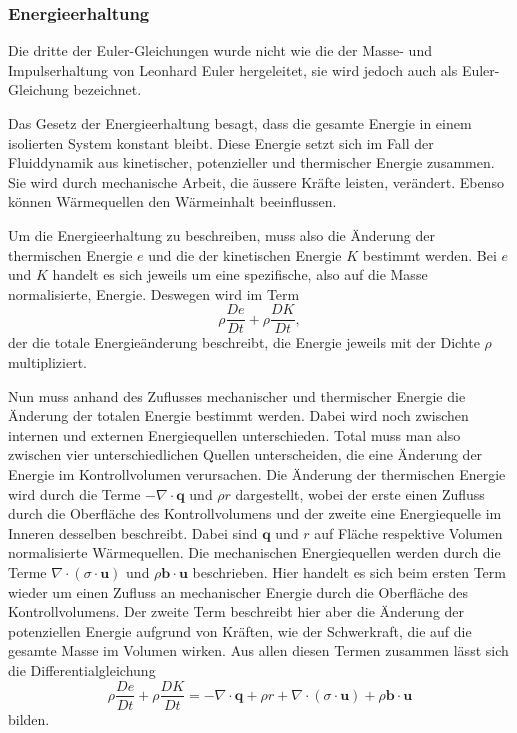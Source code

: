 \subsubsection{Energieerhaltung}
Die dritte der Euler-Gleichungen wurde nicht wie die der Masse- und Impulserhaltung von Leonhard Euler hergeleitet, sie wird jedoch auch als Euler-Gleichung bezeichnet.
%

Das Gesetz der Energieerhaltung besagt, dass die gesamte Energie in einem isolierten System konstant bleibt.
%
Diese Energie setzt sich im Fall der Fluiddynamik aus kinetischer, potenzieller und thermischer Energie zusammen.
Sie wird durch mechanische Arbeit, die äussere Kräfte leisten, verändert. Ebenso können Wärmequellen den Wärmeinhalt beeinflussen.
%
%
%

Um die Energieerhaltung zu beschreiben, muss also die Änderung der thermischen Energie $e$ und die der kinetischen Energie $K$ bestimmt werden.
%
%
%
%
Bei $e$ und  $K$ handelt es sich jeweils um eine spezifische, also auf die Masse normalisierte, Energie.
Deswegen wird im Term 
\[\rho \frac{De}{Dt}+  \rho \frac{DK}{Dt},
\]
der die totale Energieänderung beschreibt, die Energie jeweils mit der Dichte $\rho$ multipliziert.

Nun muss anhand des Zuflusses mechanischer und thermischer Energie die Änderung der totalen Energie bestimmt werden.
Dabei wird noch zwischen internen und externen Energiequellen unterschieden.
Total muss man also zwischen vier unterschiedlichen Quellen unterscheiden, die eine Änderung der Energie im Kontrollvolumen verursachen.
Die Änderung der thermischen Energie wird durch die Terme  $- \nabla \cdot \mathbf{q}$ und  $\rho r$ dargestellt, wobei der erste einen Zufluss durch die Oberfläche des Kontrollvolumens und der zweite eine Energiequelle im Inneren desselben beschreibt.
Dabei sind $\mathbf{q}$ und $r$ auf Fläche respektive Volumen normalisierte Wärmequellen.
Die mechanischen Energiequellen werden durch die Terme $\nabla \cdot (\sigma \cdot \mathbf{u})$ und $\rho \mathbf{b} \cdot \mathbf{u}$ beschrieben.
Hier handelt es sich beim ersten Term wieder um einen Zufluss an mechanischer Energie durch die Oberfläche des Kontrollvolumens.  Der zweite Term beschreibt hier aber die Änderung der potenziellen Energie aufgrund von Kräften, wie der Schwerkraft, die auf die gesamte Masse im Volumen wirken.
Aus allen diesen Termen zusammen lässt sich die Differentialgleichung
\begin{equation}
\label{openfoam:euler3}
\rho \frac{De}{Dt}+  \rho \frac{DK}{Dt}
=
- \nabla \cdot \mathbf{q} + \rho r + \nabla \cdot (\sigma \cdot \mathbf{u}) + \rho \mathbf{b} \cdot \mathbf{u} 
\end{equation} 
bilden.

